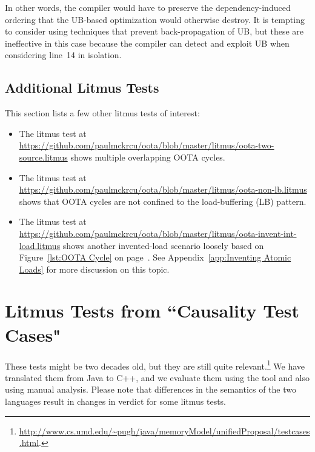 \documentclass[10]{article}
\begin{document}
In other words, the compiler would have to preserve the dependency-induced
ordering that the UB-based optimization would otherwise destroy.
It is tempting to consider using techniques
that prevent back-propagation of UB, but these are ineffective in this
case because the compiler can detect and exploit UB when
considering line~14 in isolation.

\subsection{Additional Litmus Tests}
\label{app:Additional Litmus Tests}

This section lists a few other litmus tests of interest:

\begin{itemize}
\item	The litmus test at
	\url{https://github.com/paulmckrcu/oota/blob/master/litmus/oota-two-source.litmus}
	shows multiple overlapping OOTA cycles.
\item	The litmus test at
	\url{https://github.com/paulmckrcu/oota/blob/master/litmus/oota-non-lb.litmus}
	shows that OOTA cycles are not confined to the load-buffering (LB)
	pattern.
\item	The litmus test at
	\url{https://github.com/paulmckrcu/oota/blob/master/litmus/oota-invent-int-load.litmus}
	shows another invented-load scenario loosely based on
	Figure~\ref{lst:OOTA Cycle}
	on
	page~\pageref{lst:OOTA Cycle}.
	See Appendix~\ref{app:Inventing Atomic Loads}
	for more discussion on this topic.
\end{itemize}


\clearpage

\section{Litmus Tests from “Causality Test Cases"}
\label{app:Litmus Tests from “Causality Test Cases"}

These tests might be two decades old, but they are still quite
relevant.\footnote{
	\url{http://www.cs.umd.edu/~pugh/java/memoryModel/unifiedProposal/testcases.html}.}
We have translated them from Java to C++, and we evaluate them using
the  tool and also using manual analysis.
Please note that differences in the semantics of the two languages
result in changes in verdict for some litmus tests.
\end{document}
